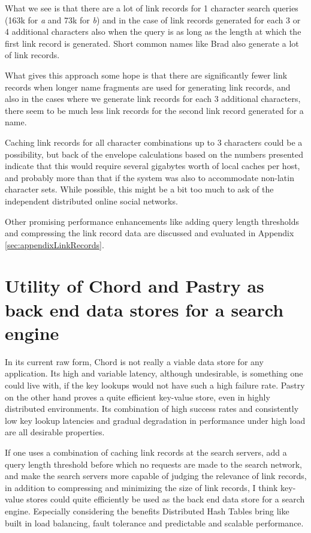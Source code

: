 What we see is that there are a lot of link records for 1 character search queries (163k for \emph{a} and 73k for \emph{b}) and in the case of link records generated for each 3 or 4 additional characters also when the query is as long as the length at which the first link record is generated. Short common names like Brad also generate a lot of link records.

What gives this approach some hope is that there are significantly fewer link records when longer name fragments are used for generating link records, and also in the cases where we generate link records for each 3 additional characters, there seem to be much less link records for the second link record generated for a name.

Caching link records for all character combinations up to 3 characters could be a possibility, but back of the envelope calculations based on the numbers presented indicate that this would require several gigabytes worth of local caches per host, and probably more than that if the system was also to accommodate non-latin character sets. While possible, this might be a bit too much to ask of the independent distributed online social networks.

Other promising performance enhancements like adding query length thresholds and compressing the link record data are discussed and evaluated in Appendix \ref{sec:appendixLinkRecords}.

\section{Utility of Chord and Pastry as back end data stores for a search engine}
In its current raw form, Chord is not really a viable data store for any application. Its high and variable latency, although undesirable, is something one could live with, if the key lookups would not have such a high failure rate.
Pastry on the other hand proves a quite efficient key-value store, even in highly distributed environments. Its combination of high success rates and consistently low key lookup latencies and gradual degradation in performance under high load are all desirable properties.

If one uses a combination of caching link records at the search servers, add a query length threshold before which no requests are made to the search network, and make the search servers more capable of judging the relevance of link records, in addition to compressing and minimizing the size of link records, I think key-value stores could quite efficiently be used as the back end data store for a search engine. Especially considering the benefits Distributed Hash Tables bring like built in load balancing, fault tolerance and predictable and scalable performance.

